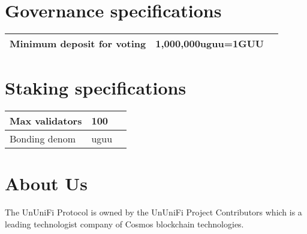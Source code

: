 \documentclass[dvipdfmx]{jsarticle}
\begin{document}
\section{Governance specifications}

\begin{table}[htb]
  \begin{tabular}{|l|l|l|}  \hline
    Minimum deposit for voting & 1,000,000uguu=1GUU \\ \hline
  \end{tabular}
\end{table}

\section{Staking specifications}

\begin{table}[htb]
  \begin{tabular}{|l|l|l|}  \hline
    Max validators & 100 \\ \hline
    Bonding denom & uguu \\ \hline
  \end{tabular}
\end{table}


\section{About Us}
The UnUniFi Protocol is owned by the UnUniFi Project Contributors which is a leading technologist company of Cosmos blockchain technologies.
\end{document}
